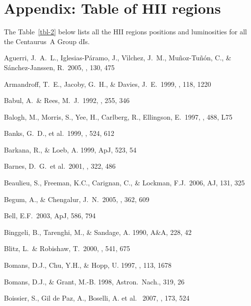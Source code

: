 \documentclass[preprint]{aastex}
\begin{document}
\appendix
\section{Appendix: Table of HII regions}
The Table~\ref{tbl-2} below lists all the HII regions positions and luminosities
for all the Centaurus~A Group dIs.

\newpage

\begin{thebibliography}{}


Aguerri, J.~A.~L., Iglesias-P{\'a}ramo, J., V{\'{\i}}lchez, J.~M., 
Mu{\~n}oz-Tu{\~n}{\'o}n, C., \& S{\'a}nchez-Janssen, R.\ 2005, \aj, 130, 475 

Armandroff, T.~E., Jacoby, G.~H., \& Davies, J.~E.\ 1999, \aj, 118, 1220

Babul, A.~\& Rees, M.~J.\ 1992, \mnras, 255, 346 

Balogh, M., Morris, S., Yee, H., Carlberg, R., Ellingson, E.\ 1997, \apj, 488, L75 

Banks, G.~D., et al.\ 1999, \apj, 524, 612 

Barkana, R., \& Loeb, A. 1999, ApJ, 523, 54

Barnes, D.~G.~et al.\ 2001, \mnras, 322, 486 

Beaulieu, S., Freeman, K.C., Carignan, C., \&  Lockman, F.J.\ 2006, AJ, 131, 325 

Begum, A., \& Chengalur, J.~N.\ 2005, \mnras, 362, 609 

Bell, E.F.\ 2003, ApJ, 586, 794

Binggeli, B., Tarenghi, M., \& Sandage, A. 1990, A\&A, 228, 42

Blitz, L.~\& Robishaw, T.\ 2000, \apj, 541, 675 

Bomans, D.J., Chu, Y.H., \& Hopp, U. 1997, \aj , 113, 1678

Bomans, D.J., \& Grant, M.-B. 1998, Astron.\ Nach., 319, 26

Boissier, S., Gil de Paz, A., Boselli, A. et al. \ 2007, \apj, 173, 524 


\end{thebibliography}
\end{document}
